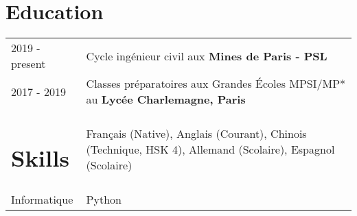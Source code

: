 \documentclass[a4paper,12pt]{article}
\begin{document}
\section{Education}
\begin{tabularx}{\linewidth}{@{}l X@{}}	
2019 - present & Cycle ingénieur civil aux \textbf{Mines de Paris - PSL} \\

2017 - 2019 & Classes préparatoires aux Grandes Écoles MPSI/MP* au \textbf{Lycée Charlemagne, Paris} \\ 

\section{Skills}
\begin{tabularx}{\linewidth}{@{}l X@{}}
Langues &  \normalsize{Français (Native), Anglais (Courant), Chinois (Technique, HSK 4), Allemand (Scolaire), Espagnol (Scolaire)}\\
Informatique &  \normalsize{Python}\\  
\end{tabularx}
\end{document}
